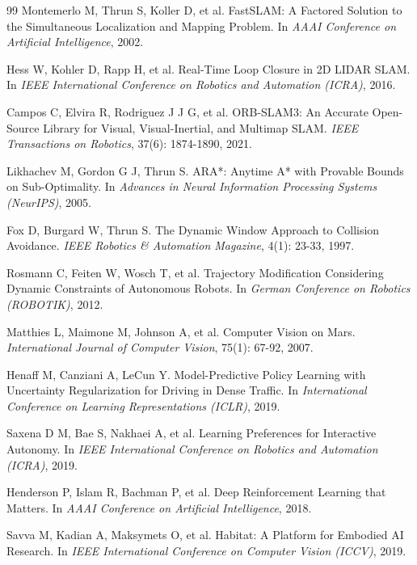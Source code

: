 \documentclass[12pt,a4paper]{ctexart}
\begin{document}
\begin{thebibliography}{99}
Montemerlo M, Thrun S, Koller D, et al.
\newblock FastSLAM: A Factored Solution to the Simultaneous Localization and Mapping Problem.
\newblock In \textit{AAAI Conference on Artificial Intelligence}, 2002.

Hess W, Kohler D, Rapp H, et al.
\newblock Real-Time Loop Closure in 2D LIDAR SLAM.
\newblock In \textit{IEEE International Conference on Robotics and Automation (ICRA)}, 2016.

Campos C, Elvira R, Rodriguez J J G, et al.
\newblock ORB-SLAM3: An Accurate Open-Source Library for Visual, Visual-Inertial, and Multimap SLAM.
\newblock \textit{IEEE Transactions on Robotics}, 37(6): 1874-1890, 2021.

Likhachev M, Gordon G J, Thrun S.
\newblock ARA*: Anytime A* with Provable Bounds on Sub-Optimality.
\newblock In \textit{Advances in Neural Information Processing Systems (NeurIPS)}, 2005.

Fox D, Burgard W, Thrun S.
\newblock The Dynamic Window Approach to Collision Avoidance.
\newblock \textit{IEEE Robotics \& Automation Magazine}, 4(1): 23-33, 1997.

Rosmann C, Feiten W, Wosch T, et al.
\newblock Trajectory Modification Considering Dynamic Constraints of Autonomous Robots.
\newblock In \textit{German Conference on Robotics (ROBOTIK)}, 2012.

Matthies L, Maimone M, Johnson A, et al.
\newblock Computer Vision on Mars.
\newblock \textit{International Journal of Computer Vision}, 75(1): 67-92, 2007.

Henaff M, Canziani A, LeCun Y.
\newblock Model-Predictive Policy Learning with Uncertainty Regularization for Driving in Dense Traffic.
\newblock In \textit{International Conference on Learning Representations (ICLR)}, 2019.

Saxena D M, Bae S, Nakhaei A, et al.
\newblock Learning Preferences for Interactive Autonomy.
\newblock In \textit{IEEE International Conference on Robotics and Automation (ICRA)}, 2019.

Henderson P, Islam R, Bachman P, et al.
\newblock Deep Reinforcement Learning that Matters.
\newblock In \textit{AAAI Conference on Artificial Intelligence}, 2018.

Savva M, Kadian A, Maksymets O, et al.
\newblock Habitat: A Platform for Embodied AI Research.
\newblock In \textit{IEEE International Conference on Computer Vision (ICCV)}, 2019.

\end{thebibliography}
\end{document}
